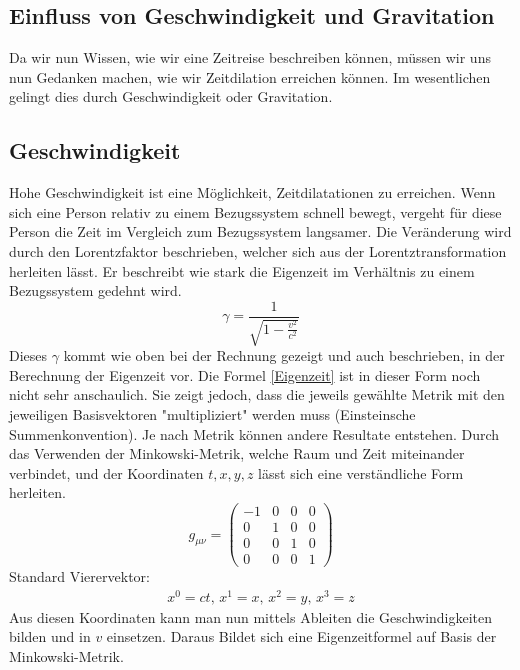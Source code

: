 \begin{refsection}
\section{Einfluss von Geschwindigkeit und Gravitation}

Da wir nun Wissen, wie wir eine Zeitreise beschreiben können, müssen wir uns nun Gedanken machen, wie wir Zeitdilation erreichen können. Im wesentlichen gelingt dies durch Geschwindigkeit oder Gravitation. 
\subsection{Geschwindigkeit}
Hohe Geschwindigkeit ist eine Möglichkeit, Zeitdilatationen zu erreichen. Wenn sich eine Person relativ zu einem Bezugssystem schnell bewegt, vergeht f\"ur diese Person die Zeit im Vergleich zum Bezugssystem langsamer. Die Ver\"anderung wird durch den Lorentzfaktor beschrieben, welcher sich aus der Lorentztransformation herleiten l\"asst. Er beschreibt wie stark die Eigenzeit im Verhältnis zu einem Bezugssystem gedehnt wird. %
\begin{equation} \label{lorentzfaktor}
    \gamma=\frac{1}{\sqrt{1-\displaystyle\frac{v^2}{c^2}}} 
\end{equation}
Dieses $\gamma$ kommt wie oben bei der Rechnung gezeigt und auch beschrieben, in der Berechnung der Eigenzeit vor. %
Die Formel \eqref{Eigenzeit} ist in dieser Form noch nicht sehr anschaulich. Sie zeigt jedoch, dass die jeweils gewählte Metrik mit den jeweiligen Basisvektoren "multipliziert" werden muss (Einsteinsche Summenkonvention). Je nach Metrik können andere Resultate entstehen.
Durch das Verwenden der Minkowski-Metrik, welche Raum und Zeit miteinander verbindet, und der Koordinaten $t, x, y, z$ l\"asst sich eine verst\"andliche Form herleiten. 
\begin{equation}
    g_{\mu\nu}=
    \begin{pmatrix}
        -1 & 0 & 0 & 0 \\
        0 & 1 & 0 & 0 \\
        0 & 0 & 1 & 0 \\
        0 & 0 & 0 & 1
    \end{pmatrix}
\end{equation}
Standard Vierervektor:
\begin{align*}
x^{0}=ct,\, x^{1}=x,\, x^{2}=y,\, x^{3}=z 
\end{align*}
Aus diesen Koordinaten kann man nun mittels Ableiten die Geschwindigkeiten bilden und in $v$ einsetzen.
Daraus Bildet sich eine Eigenzeitformel auf Basis der Minkowski-Metrik.

\end{refsection}
